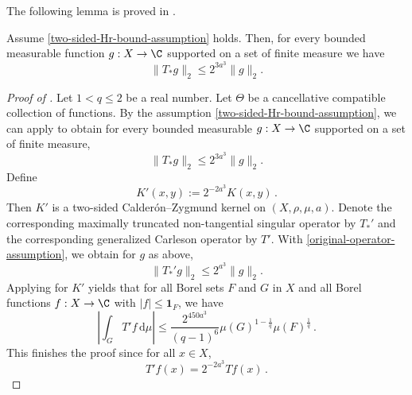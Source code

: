 The following lemma is proved in .
\begin{lemma}\label{nontangential-from-simple}
    Assume \eqref{two-sided-Hr-bound-assumption} holds.
    Then, for every bounded measurable function $g : X \to \C$ supported on a set of finite measure we have
    \begin{equation}\label{concretetstarbound}
        \|T_*g\|_2\le 2^{3a^3}\|g\|_2.
    \end{equation}
\end{lemma}

\begin{proof}[Proof of ]
    Let $1<q\le 2$ be a real number. Let $\Theta$ be a cancellative compatible collection of functions.
    By the assumption \eqref{two-sided-Hr-bound-assumption}, we can apply  to obtain for every bounded measurable $g:X\to\C$ supported on a set of finite measure,
    \begin{equation}\label{original-operator-assumption}
        \|T_*g\|_2\le 2^{3a^3}\|g\|_2.
    \end{equation}
    Define
    \begin{equation*}
        K'(x,y):= 2^{-2a^3} K(x,y) \,.
    \end{equation*}
    Then $K'$ is a two-sided Calder\'on--Zygmund kernel on $(X,\rho,\mu,a)$. Denote the corresponding maximally truncated non-tangential singular operator by $T_*'$ and the corresponding generalized Carleson operator by $T'$.
    With \eqref{original-operator-assumption}, we obtain for $g$ as above,
    \begin{equation}\label{modified-operator-assumption}
        \|T_*'g\|_2\le 2^{a^3}\|g\|_2.
    \end{equation}
    Applying  for $K'$ yields that for all Borel sets $F$ and $G$ in $X$ and
    all Borel functions $f:X\to \C$ with
    $|f|\le \mathbf{1}_F$, we have
    \begin{equation*}
        \left|\int_{G} T' f \, \mathrm{d}\mu\right| \leq \frac{2^{450a^3}}{(q-1)^6} \mu(G)^{1-\frac{1}{q}} \mu(F)^{\frac{1}{q}}\, .
    \end{equation*}
    This finishes the proof since for all $x\in X$,
    \begin{equation*}
        T'f(x) = 2^{-2a^3} Tf(x) \,.
    \end{equation*}
\end{proof}

